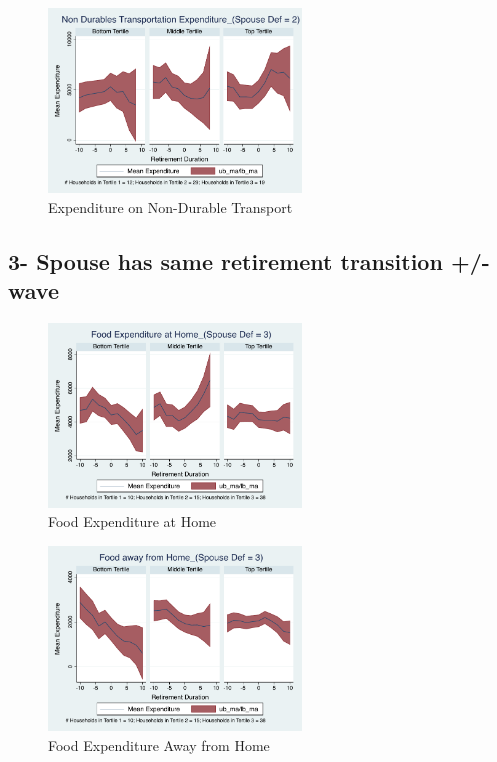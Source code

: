 \documentclass[11pt,onecolumn]{article}
\begin{document}
\begin{figure}[h]
	\caption{Expenditure on Non-Durable Transport}
	\centering
	\includegraphics[width=0.6\textwidth]{../ConsumptionPostRetirement_by_SpouseDef_Cats/Smoothed/2/spouse_def_total_transport_real.pdf}
\end{figure}
\clearpage


\subsection{3- Spouse has same retirement transition +/- wave}

\begin{figure}[h]
	\caption{Food Expenditure at Home}
	\centering
	\includegraphics[width=0.6\textwidth]{../ConsumptionPostRetirement_by_SpouseDef_Cats/Smoothed/3/spouse_def_total_foodexp_home_real.pdf}
\end{figure}


\begin{figure}[h]
	\caption{Food Expenditure Away from Home}
	\centering
	\includegraphics[width=0.6\textwidth]{../ConsumptionPostRetirement_by_SpouseDef_Cats/Smoothed/3/spouse_def_total_foodexp_away_real.pdf}
\end{figure}
\end{document}
